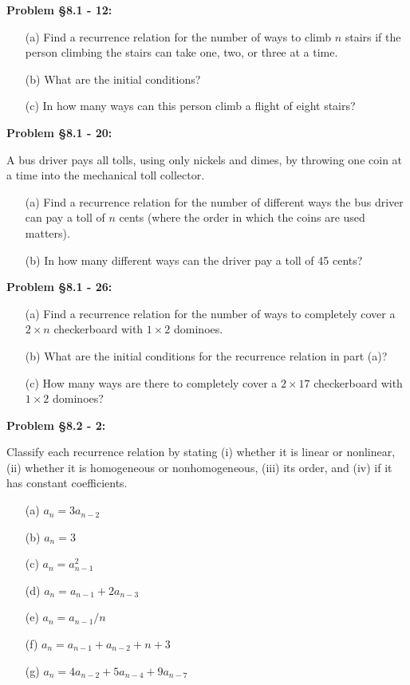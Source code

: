 \documentclass{article}
\newenvironment{problem}[1]
    {\begin{mdframed}[default]
    \textbf{Problem #1:}
    }
    {\end{mdframed}
    }
\begin{document}
\begin{problem}{\S 8.1 - 12}
\begin{itemize}
    \item[(a)] Find a recurrence relation for the number of ways to climb $n$ stairs if the person climbing the stairs can take one, two, or three at a time.
    \item[(b)] What are the initial conditions?
    \item[(c)] In how many ways can this person climb a flight of eight stairs?
\end{itemize}
\end{problem}

\begin{problem}{\S 8.1 - 20}
A bus driver pays all tolls, using only nickels and dimes, by throwing one coin at a time into the mechanical toll collector.
\begin{itemize}
    \item[(a)] Find a recurrence relation for the number of different ways the bus driver can pay a toll of $n$ cents (where the order in which the coins are used matters).
    \item[(b)] In how many different ways can the driver pay a toll of 45 cents?
\end{itemize}
\end{problem}

\begin{problem}{\S 8.1 - 26}
\begin{itemize}
    \item[(a)] Find a recurrence relation for the number of ways to completely cover a $2 \times n$ checkerboard with $1 \times 2$ dominoes.
    \item[(b)] What are the initial conditions for the recurrence relation in part (a)?
    \item[(c)] How many ways are there to completely cover a $2 \times 17$ checkerboard with $1 \times 2$ dominoes?
\end{itemize}
\end{problem}

\begin{problem}{\S 8.2 - 2}
Classify each recurrence relation by stating (i) whether it is linear or nonlinear, (ii) whether it is homogeneous or nonhomogeneous, (iii) its order, and (iv) if it has constant coefficients.
\begin{itemize}
    \item[(a)] $a_n = 3a_{n-2}$
    \item[(b)] $a_n = 3$
    \item[(c)] $a_n = a_{n-1}^2$
    \item[(d)] $a_n = a_{n-1} + 2a_{n-3}$
    \item[(e)] $a_n = a_{n-1}/n$
    \item[(f)] $a_n = a_{n-1} + a_{n-2} + n + 3$
    \item[(g)] $a_n = 4a_{n-2} + 5a_{n-4} + 9a_{n-7}$
\end{itemize}
\end{problem}
\end{document}
